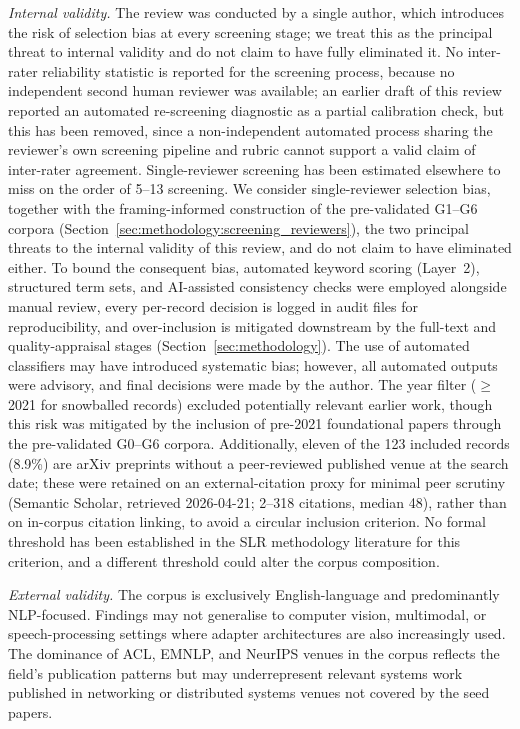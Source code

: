 \textit{Internal validity.}
The review was conducted by a single author, which introduces the risk of selection bias at every screening stage; we treat this as the principal threat to internal validity and do not claim to have fully eliminated it. No inter-rater reliability statistic is reported for the screening
process, because no independent second human reviewer was available; an
earlier draft of this review reported an automated re-screening
diagnostic as a partial calibration check, but this has been removed,
since a non-independent automated process sharing the reviewer's own
screening pipeline and rubric cannot support a valid claim of inter-rater
agreement. Single-reviewer screening has been estimated elsewhere to miss
on the order of 5--13%
screening. We consider single-reviewer selection bias, together with the
framing-informed construction of the pre-validated G1--G6 corpora
(Section~\ref{sec:methodology:screening_reviewers}), the two principal
threats to the internal validity of this review, and do not claim to
have eliminated either. To bound the consequent bias, automated keyword scoring (Layer~2), structured term sets, and AI-assisted consistency checks were employed alongside manual review, every per-record decision is logged in audit files for reproducibility, and over-inclusion is mitigated downstream by the full-text and quality-appraisal stages (Section~\ref{sec:methodology}). The use of automated classifiers may have introduced systematic bias; however, all automated outputs were advisory, and final decisions were made by the author. The year filter ($\geq$2021 for snowballed records) excluded potentially relevant earlier work, though this risk was mitigated by the inclusion of pre-2021 foundational papers through the pre-validated G0--G6 corpora. Additionally, eleven of the 123 included records (8.9\%) are arXiv preprints without a peer-reviewed published venue at the search date; these were retained on an external-citation proxy for minimal peer scrutiny (Semantic Scholar, retrieved 2026-04-21; 2--318 citations, median 48), rather than on in-corpus citation linking, to avoid a circular inclusion criterion. No formal threshold has been established in the SLR methodology literature for this criterion, and a different threshold could alter the corpus composition.

\textit{External validity.}
The corpus is exclusively English-language and predominantly NLP-focused. Findings may not generalise to computer vision, multimodal, or speech-processing settings where adapter architectures are also increasingly used. The dominance of ACL, EMNLP, and NeurIPS venues in the corpus reflects the field's publication patterns but may underrepresent relevant systems work published in networking or distributed systems venues not covered by the seed papers.


